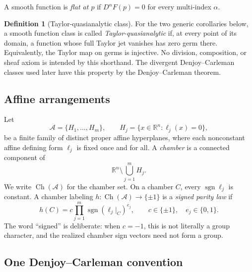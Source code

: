 \documentclass[11pt]{article}
\theoremstyle{definition}
\newtheorem{definition}[theorem]{Definition}
\theoremstyle{remark}
\newcommand{\R}{\mathbb{R}}
\newcommand{\bits}{\{0,1\}}
\newcommand{\sign}{\operatorname{sgn}}
\newcommand{\Ch}{\operatorname{Ch}}
\newcommand{\cA}{\mathcal{A}}
\begin{document}
A smooth function is \emph{flat at $p$} if $D^\alpha F(p)=0$ for every multi-index $\alpha$.

\begin{definition}[Taylor-quasianalytic class]\label{def:taylorquasi}
For the two generic corollaries below, a smooth function class is called \emph{Taylor-quasianalytic} if, at every point of its domain, a function whose full Taylor jet vanishes has zero germ there. Equivalently, the Taylor map on germs is injective. No division, composition, or sheaf axiom is intended by this shorthand. The divergent Denjoy--Carleman classes used later have this property by the Denjoy--Carleman theorem.
\end{definition}

\subsection{Affine arrangements}

Let
\[
 \cA=\{H_1,\dots,H_m\},\qquad H_j=\{x\in\R^n:\ell_j(x)=0\},
\]
be a finite family of distinct proper affine hyperplanes, where each nonconstant affine defining form $\ell_j$ is fixed once and for all. A \emph{chamber} is a connected component of
\[
 \R^n\setminus\bigcup_{j=1}^m H_j.
\]
We write $\Ch(\cA)$ for the chamber set. On a chamber $C$, every $\sign\ell_j$ is constant. A chamber labeling $h:\Ch(\cA)\to\{\pm1\}$ is a \emph{signed parity law} if
\begin{equation}\label{eq:signed-parity}
 h(C)=c\prod_{j=1}^m \sign(\ell_j|_C)^{e_j},
 \qquad c\in\{\pm1\},\quad e_j\in\bits.
\end{equation}
The word ``signed'' is deliberate: when $c=-1$, this is not literally a group character, and the realized chamber sign vectors need not form a group.

\subsection{One Denjoy--Carleman convention}
\end{document}
